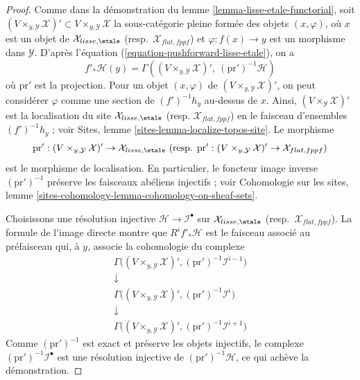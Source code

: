 \begin{proof}
Comme dans la démonstration du lemme \ref{lemma-lisse-etale-functorial},
soit $(V \times_{y, \mathcal{Y}} \mathcal{X})' \subset
V \times_{y, \mathcal{Y}} \mathcal{X}$ la sous-catégorie pleine
formée des objets $(x, \varphi)$, où $x$ est un objet de
$\mathcal{X}_{lisse,\etale}$ (resp.\ $\mathcal{X}_{flat,fppf}$)
et $\varphi : f(x) \to y$ est un morphisme dans $\mathcal{Y}$.
D'après l'équation (\ref{equation-pushforward-lisse-etale}),
on a
$$
f'_*\mathcal{H}(y) =
\Gamma((V \times_{y, \mathcal{Y}} \mathcal{X})',
\ (\text{pr}')^{-1}\mathcal{H})
$$
où $\text{pr}'$ est la projection. Pour un objet $(x, \varphi)$
de $(V \times_{y, \mathcal{Y}} \mathcal{X})'$,
on peut considérer $\varphi$ comme une section de $(f')^{-1}h_y$ au-dessus de $x$.
Ainsi, $(V \times_\mathcal{Y} \mathcal{X})'$ est la localisation
du site $\mathcal{X}_{lisse,\etale}$
(resp. $\mathcal{X}_{flat,fppf}$) en le faisceau d'ensembles $(f')^{-1}h_y$ ; voir
Sites, lemme \ref{sites-lemma-localize-topos-site}. Le morphisme
$$
\text{pr}' : (V \times_{y, \mathcal{Y}} \mathcal{X})'
\to \mathcal{X}_{lisse,\etale}
\ (\text{resp. }
\text{pr}' : (V \times_{y, \mathcal{Y}} \mathcal{X})'
\to \mathcal{X}_{flat,fppf})
$$
est le morphisme de localisation.
En particulier, le foncteur image inverse $(\text{pr}')^{-1}$ préserve
les faisceaux abéliens injectifs ; voir
Cohomologie sur les sites, lemme
\ref{sites-cohomology-lemma-cohomology-on-sheaf-sets}.

\medskip\noindent
Choisissons une résolution injective $\mathcal{H} \to \mathcal{I}^\bullet$
sur $\mathcal{X}_{lisse,\etale}$ (resp.\ $\mathcal{X}_{flat,fppf}$).
La formule de l'image directe montre que $R^if'_*\mathcal{H}$ est le
faisceau associé au préfaisceau qui, à $y$, associe la cohomologie
du complexe
$$
\begin{matrix}
\Gamma\Big((V \times_{y, \mathcal{Y}} \mathcal{X})',
(\text{pr}')^{-1}\mathcal{I}^{i - 1}\Big) \\
\downarrow \\
\Gamma\Big((V \times_{y, \mathcal{Y}} \mathcal{X})',
(\text{pr}')^{-1}\mathcal{I}^i\Big) \\
\downarrow \\
\Gamma\Big((V \times_{y, \mathcal{Y}} \mathcal{X})',
(\text{pr}')^{-1}\mathcal{I}^{i + 1}\Big)
\end{matrix}
$$
Comme $(\text{pr}')^{-1}$ est exact et préserve les objets injectifs, le
complexe $(\text{pr}')^{-1}\mathcal{I}^\bullet$ est une
résolution injective de $(\text{pr}')^{-1}\mathcal{H}$,
ce qui achève la démonstration.
\end{proof}

